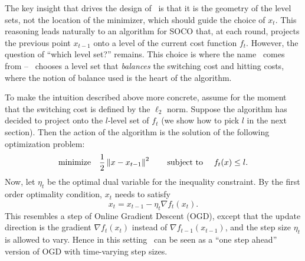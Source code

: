 The key insight that drives the design of \ourack\ is that it is the geometry of the level sets, not the location of the minimizer, which should guide the choice of $x_t$. %
This reasoning leads naturally to an algorithm for SOCO that, at each round, projects the previous point $x_{t-1}$ onto a level of the current cost function $f_t$. However, the question of ``which level set?'' remains.  This choice is where the name \ouralg\ comes from -- \ourack\ chooses a level set that \emph{balances} the switching cost and hitting costs, where the notion of balance used is the heart of the algorithm.  

To make the intuition described above more concrete, assume for the moment that the switching cost is defined by the $\ell_2$ norm. Suppose the algorithm has decided to project onto the $l$-level set of $f_t$ (we show how to pick $l$ in the next section). Then the action of the algorithm is the solution of the following optimization problem: 
%
\begin{align*}
\text{minimize} \quad \frac{1}{2}\left\lVert x - x_{t-1} \right\rVert^2 \qquad \text{subject to } \quad f_t(x) \le l.
\end{align*}
%
Now, let $\eta_t$ be the optimal dual variable for the inequality constraint. By the first order optimality condition, $x_t$ needs to satisfy 
$$x_t = x_{t-1} - \eta_t \nabla f_t(x_t).$$
This resembles a step of Online Gradient Descent (OGD), except that the update direction is the gradient $\nabla f_t(x_t)$ instead of $\nabla f_{t-1}(x_{t-1})$, and the step size $\eta_t$ is allowed to vary. Hence in this setting \ourack\ can be seen as a ``one step ahead'' version of OGD with time-varying step sizes.

